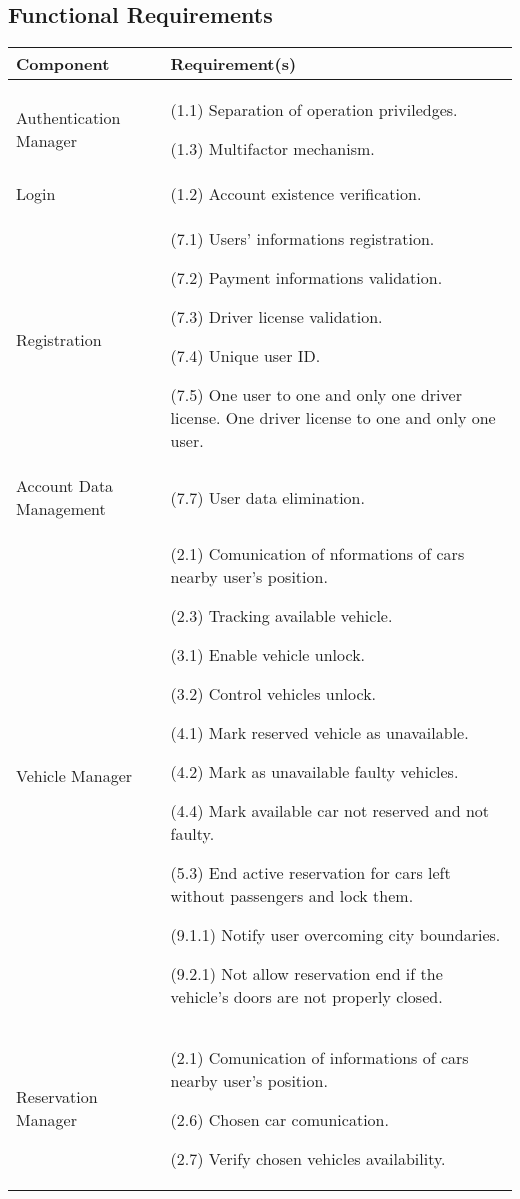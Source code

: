 \subsection{Functional Requirements}

\begin{longtable}{ |l|p{10cm}| }
	\hline
	\textbf{Component} & \textbf{Requirement(s)}\\ \hline
	Authentication Manager & (1.1) Separation of operation priviledges.

(1.3) Multifactor mechanism.\\ \hline
	Login & (1.2) Account existence verification.\\ \hline
	Registration & (7.1) Users' informations registration.

(7.2) Payment informations validation.

(7.3) Driver license validation.

(7.4) Unique user ID.

(7.5) One user to one and only one driver license. One driver license to one and only one user.\\ \hline

	Account Data Management & (7.7) User data elimination.\\ \hline

	Vehicle Manager & (2.1) Comunication of nformations of cars nearby user's position.

(2.3) Tracking available vehicle.

(3.1) Enable vehicle unlock.

(3.2) Control vehicles unlock.

(4.1) Mark reserved vehicle as unavailable.

(4.2) Mark as unavailable faulty vehicles.

(4.4) Mark available car not reserved and not faulty.

(5.3) End active reservation for cars left without passengers and lock them.

(9.1.1) Notify user overcoming city boundaries.

(9.2.1) Not allow reservation end if the vehicle's doors are not properly closed.
\\ \hline

	Reservation Manager & (2.1) Comunication of informations of cars nearby user's position.

(2.6) Chosen car comunication.

(2.7) Verify chosen vehicles availability.


\end{longtable}
